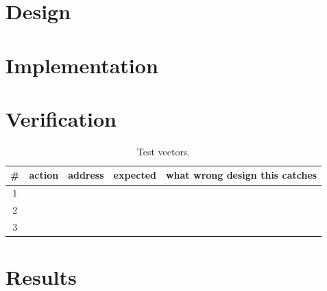 
\section{Design}

\section{Implementation}


\section{Verification}
%

\begin{table}[htbp]
\centering
\caption{Test vectors.}
\label{tab:lab06-vectors}
\begin{tabular}{clllp{4.6cm}}
\toprule
\# & action & address & expected & what wrong design this catches \\
\midrule
1 & & & & \\
2 & & & & \\
3 & & & & \\
\bottomrule
\end{tabular}
\end{table}

\section{Results}

